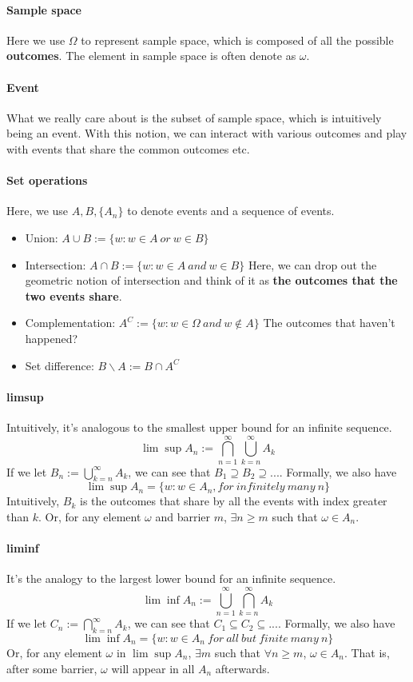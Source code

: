 \documentclass[Probability_Theory.tex]{subfiles}
\begin{document}
\paragraph{Sample space}
Here we use $\Omega$ to represent sample space, which is composed of all the possible {\bf outcomes}. The element in sample space is often denote as $\omega$.
\paragraph{Event}
What we really care about is the subset of sample space, which is intuitively being an event. With this notion, we can interact with various outcomes and play with events that share the common outcomes etc.
\paragraph{Set operations} Here, we use $A,B,\{A_n\}$ to denote events and a sequence of events.
\begin{itemize}
	\item Union: $A\cup B := \{w:w\in A\ or\ w\in B \}$
	\item Intersection: $A\cap B := \{w:w\in A\ and\ w\in B \}$
	Here, we can drop out the geometric notion of intersection and think of it as {\bf the outcomes that the two events share}.
	\item Complementation: $A^C:=\{w:w\in\Omega\ and\ w\notin A \}$
	The outcomes that haven't happened?
	\item Set difference: $B\backslash A:= B\cap A^C$
\end{itemize}

\paragraph{limsup}
Intuitively, it's analogous to the smallest upper bound for an infinite sequence.
$$\lim\sup A_n := \bigcap_{n=1}^{\infty}\bigcup_{k=n}^{\infty} A_k$$
If we let $B_n:=\bigcup_{k=n}^{\infty} A_k$, we can see that $B_1\supseteq B_2\supseteq...$. Formally, we also have
$$\lim\sup A_n = \{w:w\in A_n, for\ infinitely\ many\ n \}$$
Intuitively, $B_k$ is the outcomes that share by all the events with index greater than $k$.
Or, for any element $\omega$ and barrier $m$, $\exists n\geq m$ such that $\omega\in A_n$.

\paragraph{liminf}
It's the analogy to the largest lower bound for an infinite sequence.
$$\lim\inf A_n:= \bigcup_{n=1}^{\infty}\bigcap_{k=n}^{\infty} A_k$$
If we let $C_n:= \bigcap_{k=n}^{\infty} A_k$, we can see that $C_1\subseteq C_2\subseteq...$. Formally, we also have
$$\lim\inf A_n=\{w:w\in A_n\ for\ all\ but\ finite\ many\ n \}$$
Or, for any element $\omega$ in $\lim\sup A_n$, $\exists m$ such that $\forall n\geq m$, $\omega\in A_n$. That is, after some barrier, $\omega$ will appear in all $A_n$ afterwards.
\end{document}
